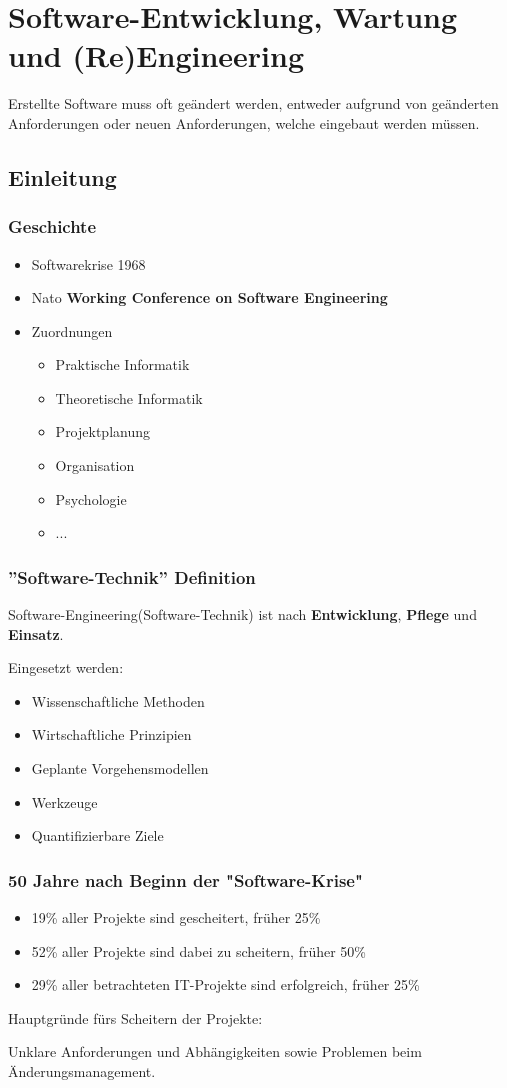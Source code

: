	\section{Software-Entwicklung, Wartung und (Re)Engineering}
	Erstellte Software muss oft geändert werden, entweder aufgrund von geänderten Anforderungen oder neuen Anforderungen, welche eingebaut werden müssen.
	\subsection{Einleitung}
	\subsubsection{Geschichte}
	\begin{itemize}
		\item Softwarekrise 1968
		\item Nato \textbf{Working Conference on Software Engineering}
		\item Zuordnungen
		\begin{itemize}
			\item Praktische Informatik
			\item Theoretische Informatik
			\item Projektplanung
			\item Organisation
			\item Psychologie
			\item ...
		\end{itemize}
	\end{itemize}
	\subsubsection{''Software-Technik'' Definition}
	Software-Engineering(Software-Technik) ist nach \textbf{Entwicklung}, \textbf{Pflege} und \textbf{Einsatz}.
	\par 
	Eingesetzt werden:
	\begin{itemize}
		\item Wissenschaftliche Methoden
		\item Wirtschaftliche Prinzipien
		\item Geplante Vorgehensmodellen
		\item Werkzeuge
		\item Quantifizierbare Ziele
	\end{itemize}
	\subsubsection{50 Jahre nach Beginn der "Software-Krise"}
	\begin{itemize}
		\item 19\% aller Projekte sind gescheitert, früher 25\%
		\item 52\% aller Projekte sind dabei zu scheitern, früher 50\%
		\item 29\% aller betrachteten IT-Projekte sind erfolgreich, früher 25\%
	\end{itemize}
	Hauptgründe fürs Scheitern der Projekte:
	\par 
	Unklare Anforderungen und Abhängigkeiten sowie Problemen beim Änderungsmanagement.
